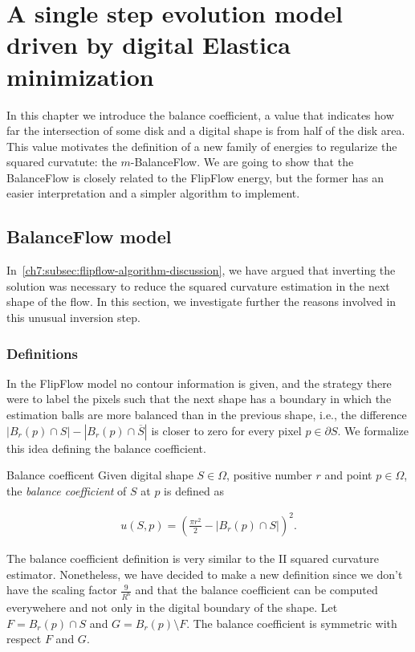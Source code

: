 \chapter{A single step evolution model driven by digital Elastica minimization}
\label{chapter:balance-flow}


In this chapter we introduce the balance coefficient, a value that indicates how far the intersection of some disk and a digital shape is from half of the disk area. This value motivates the definition of a new family of energies to regularize the squared curvatute: the $m$-BalanceFlow. We are going to show that the BalanceFlow is closely related to the FlipFlow energy, but the former has an easier interpretation and a simpler algorithm to implement.


\section{BalanceFlow model}
In~\cref{ch7:subsec:flipflow-algorithm-discussion}, we have argued that inverting the solution was necessary to reduce the squared curvature estimation in the next shape of the flow. In this section, we investigate further the reasons involved in this unusual inversion step. 

\subsection{Definitions}

In the FlipFlow model no contour information is given, and the strategy there were to label the pixels such that the next shape has a boundary in which the estimation balls are more balanced than in the previous shape, i.e., the difference $|B_r(p) \cap S| - |B_r(p) \cap \overline{S}|$ is closer to zero for every pixel $p \in \partial S$.  We formalize this idea defining the balance coefficient.

\begin{definition}{Balance coefficent}
Given digital shape $S \in \Omega$, positive number $r$ and point $p \in \Omega$, the \emph{balance coefficient} of $S$ at $p$ is defined as

\begin{align*}
	u(S,p) = ( \frac{\pi r^2}{2} - |B_r(p) \cap S| )^2.
\end{align*}

\end{definition}

The balance coefficient definition is very similar to the II squared curvature estimator. Nonetheless, we have decided to make a new definition since we don't have the scaling factor $\frac{9}{R^6}$ and that the balance coefficient can be computed everywehere and not only in the digital boundary of the shape. Let $F=B_r(p) \cap S$ and $G=B_r(p) \setminus F$. The balance coefficient is symmetric with respect $F$ and $G$. 

